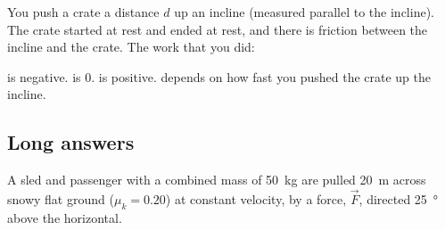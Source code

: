 \question You push a crate a distance $d$ up an incline (measured parallel to the incline). The crate started at rest and ended at rest, and there is friction between the incline and the crate. The work that you did:
\begin{checkboxes}
\choice is negative.
\choice is 0.
\CorrectChoice is positive.
\choice depends on how fast you pushed the crate up the incline.
\end{checkboxes}


%
%
\subsection{Long answers}
\question A sled and passenger with a combined mass of \SI{50}{kg} are pulled \SI{20}{m} across snowy flat ground ($\mu_k = 0.20$) at constant velocity, by a force, $\vec F$, directed \SI{25}{\degree} above the horizontal.

\begin{finalanswer}
\end{finalanswer}

